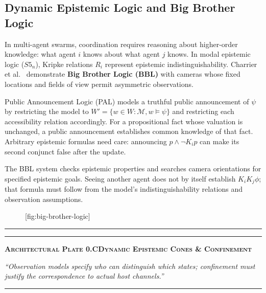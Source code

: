 \subsection{Dynamic Epistemic Logic and Big Brother Logic}

In multi-agent swarms, coordination requires reasoning about higher-order knowledge: what agent $i$ knows about what agent $j$ knows. In modal epistemic logic ($S5_n$), Kripke relations $R_i$ represent epistemic indistinguishability. Charrier et al.~ demonstrate \textbf{Big Brother Logic (BBL)} with cameras whose fixed locations and fields of view permit asymmetric observations.

Public Announcement Logic (PAL) models a truthful public announcement of $\psi$ by restricting the model to $W'=\{w\in W:\mathcal M,w\models\psi\}$ and restricting each accessibility relation accordingly. For a propositional fact whose valuation is unchanged, a public announcement establishes common knowledge of that fact. Arbitrary epistemic formulas need care: announcing $p\land\neg K_i p$ can make its second conjunct false after the update.

The BBL system checks epistemic properties and searches camera orientations for specified epistemic goals. Seeing another agent does not by itself establish $K_iK_j\phi$; that formula must follow from the model's indistinguishability relations and observation assumptions.

\begin{figure}[tp]
  \centering
  [fig:big-brother-logic]
\end{figure}

\vspace{10pt}
\noindent\begin{minipage}{\linewidth}
  \centering
  \par\vspace{8pt}%
  {\color{pdcobalt}\rule{\linewidth}{1.2pt}}\par\vspace{5pt}%
  \raggedright
  {\color{pdswissred}\rule{4.5pt}{4.5pt}}\enspace%
  {\pdgrotesk\bfseries\scshape\fontsize{9}{11}\selectfont\color{hhink}%
    Architectural Plate 0.C\enspace\textperiodcentered\enspace Dynamic Epistemic Cones \& Confinement}\par\vspace{4pt}%
  {\pdgrotesk\itshape\fontsize{9.5}{13}\selectfont\color{hhink}%
    ``Observation models specify who can distinguish which states; confinement must justify the correspondence to actual host channels.''}\par\vspace{6pt}%
  {\color{hhgray!30}\rule{\linewidth}{0.4pt}}
\end{minipage}
\vspace{10pt}

